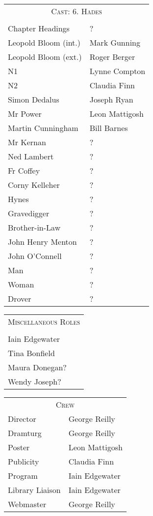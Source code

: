 \begin{tabular}{lp{10cm}}
    \multicolumn{2}{c}{\Large \textsc{Cast: 6. Hades}} \\
\\
Chapter Headings  & ?\\
Leopold Bloom (int.)  & Mark Gunning \\
Leopold Bloom (ext.)  & Roger Berger \\
N1  & Lynne Compton \\
N2  & Claudia Finn \\
Simon Dedalus  & Joseph Ryan \\
Mr Power  & Leon Mattigosh \\
Martin Cunningham  & Bill Barnes \\
Mr Kernan  & ?\\
Ned Lambert  & ?\\
Fr Coffey  & ?\\
Corny Kelleher  & ?\\
Hynes  & ?\\
Gravedigger  & ?\\
Brother-in-Law  & ?\\
John Henry Menton  & ?\\
John O'Connell  & ?\\
Man  & ?\\
Woman  & ?\\
Drover  & ?\\
\end{tabular}

\bigskip
\bigskip

\begin{tabular}{lp{10cm}}
    \multicolumn{2}{c}{\Large \textsc{Miscellaneous Roles}} \\
\\
Iain Edgewater &   \\
Tina Bonfield  &  \\
Maura Donegan?  &  \\
Wendy Joseph?  &  \\
\end{tabular}

\bigskip
\bigskip


\begin{tabular}{lp{10cm}}
    \multicolumn{2}{c}{\Large \textsc{Crew}} \\
Director & George Reilly \\
Dramturg & George Reilly \\
Poster & Leon Mattigosh \\
Publicity & Claudia Finn \\
Program & Iain Edgewater \\
Library Liaison & Iain Edgewater \\
Webmaster & George Reilly \\
\end{tabular}
\thispagestyle{empty}

